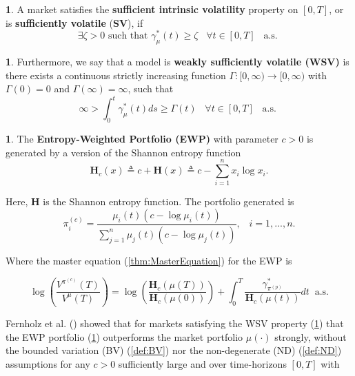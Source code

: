 \documentclass[british]{amsart}
\numberwithin{equation}{section}
\numberwithin{figure}{section}
\theoremstyle{plain}
\theoremstyle{definition}
\newtheorem{defn}[thm]{\protect\definitionname}
\theoremstyle{plain}
\theoremstyle{plain}
\theoremstyle{plain}
\theoremstyle{remark}
\theoremstyle{plain}
\providecommand{\definitionname}{Definition}
\begin{document}
\begin{defn}
\label{SV}A market satisfies the \textbf{sufficient intrinsic volatility}
property on $[0,T]$, or is \textbf{sufficiently volatile} (\textbf{SV}),
if
\begin{equation}
\exists\zeta>0\text{ such that }\gamma_{\mu}^{*}(t)\ge\zeta\;\;\;\forall t\in[0,T]\;\;\;\text{a.s. }
\end{equation}
\end{defn}
%
\begin{defn}
\label{WSV}Furthermore, we say that a model is \textbf{weakly sufficiently
volatile (WSV) }is there exists a continuous strictly increasing function
$\Gamma:[0,\infty)\to[0,\infty)$ with $\Gamma(0)=0$ and $\Gamma(\infty)=\infty$,
such that
\begin{equation}
\infty>\int_{0}^{t}\gamma_{\mu}^{*}(t)ds\ge\Gamma(t)\;\;\;\forall t\in[0,T]\;\;\;\text{a.s. }
\end{equation}
\end{defn}
%
\begin{defn}
\label{EWP}The \textbf{Entropy-Weighted Portfolio (EWP) }with parameter
$c>0$ is generated by a version of the Shannon entropy function
\begin{equation}
\mathbf{H}_{c}(x)\triangleq c+\mathbf{H}(x)\triangleq c-\sum_{i=1}^{n}x_{i}\log x_{i}.
\end{equation}

Here, $\mathbf{H}$ is the Shannon entropy function. The portfolio
generated is
\begin{equation}
\pi_{i}^{(c)}=\frac{\mu_{i}(t)(c-\log\mu_{i}(t))}{\sum_{j=1}^{n}\mu_{j}(t)(c-\log\mu_{j}(t))},\;\;\;i=1,...,n.
\end{equation}

Where the master equation (\ref{thm:MasterEquation}) for the EWP
is

\begin{equation}
\log\left(\frac{V^{\pi^{(c)}}(T)}{V^{\mu}(T)}\right)=\log\left(\frac{\mathbf{H}_{c}(\mu(T))}{\mathbf{H}_{c}(\mu(0))}\right)+\int_{0}^{T}\frac{\gamma_{\pi^{(p)}}^{*}}{\mathbf{H}_{c}(\mu(t))}dt\;\;\text{a.s.}
\end{equation}
\end{defn}
Fernholz et al. (\cite{Fernholz2005a}) showed that for markets satisfying
the WSV property (\ref{WSV}) that the EWP portfolio (\ref{EWP})
outperforms the market portfolio $\mu(\cdot)$ strongly, without the
bounded variation (BV) (\ref{def:BV}) nor the non-degenerate (ND)
(\ref{def:ND}) assumptions for any $c>0$ sufficiently large and
over time-horizons $[0,T]$ with
\end{document}
